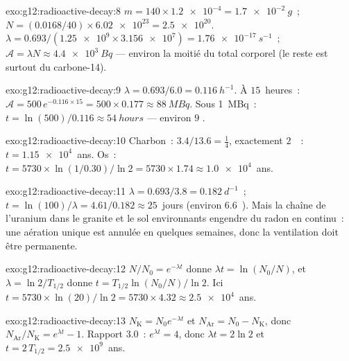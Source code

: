 \begin{solution}{exo:g12:radioactive-decay:8}
$m = 140 \times \num{1.2e-4} = \qty{1.7e-2}{g}$~;
$N = (0.0168/40) \times \num{6.02e23} = \num{2.5e20}$.
$\lambda = 0.693/(\num{1.25e9} \times \num{3.156e7}) =
\qty{1.76e-17}{s^{-1}}$~; $\mathcal A = \lambda N \approx
\qty{4.4e3}{Bq}$ --- environ la moitié du total corporel (le reste
est surtout du carbone-14).
\end{solution}

\begin{solution}{exo:g12:radioactive-decay:9}
$\lambda = 0.693/6.0 = \qty{0.116}{h^{-1}}$. À $15$~heures~:
$\mathcal A = 500\,e^{-0.116 \times 15} = 500 \times 0.177 \approx
\qty{88}{MBq}$. Sous \qty{1}{MBq}~:
$t = \ln(500)/0.116 \approx \qty{54}{hours}$ --- environ $9$
.
\end{solution}

\begin{solution}{exo:g12:radioactive-decay:10}
Charbon~: $3.4/13.6 = \tfrac14$, exactement $2$~~:
$t = \num{1.15e4}$~ans. Os~:
$t = \num{5730} \times \ln(1/0.30)/\ln 2 = \num{5730} \times 1.74
\approx \num{1.0e4}$~ans.
\end{solution}

\begin{solution}{exo:g12:radioactive-decay:11}
$\lambda = 0.693/3.8 = \qty{0.182}{d^{-1}}$~;
$t = \ln(100)/\lambda = 4.61/0.182 \approx 25$~jours (environ
$6.6$~). Mais la chaîne de l'uranium dans le granite et le
sol environnants engendre du radon en continu~: une aération unique
est annulée en quelques semaines, donc la ventilation doit être
permanente.
\end{solution}

\begin{solution}{exo:g12:radioactive-decay:12}
$N/N_0 = e^{-\lambda t}$ donne $\lambda t = \ln(N_0/N)$, et
$\lambda = \ln 2/T_{1/2}$ donne $t = T_{1/2}\ln(N_0/N)/\ln 2$. Ici
$t = \num{5730} \times \ln(20)/\ln 2 = \num{5730} \times 4.32
\approx \num{2.5e4}$~ans.
\end{solution}

\begin{solution}{exo:g12:radioactive-decay:13}
$N_{\mathrm K} = N_0 e^{-\lambda t}$ et
$N_{\mathrm{Ar}} = N_0 - N_{\mathrm K}$, donc
$N_{\mathrm{Ar}}/N_{\mathrm K} = e^{\lambda t} - 1$. Rapport $3.0$~:
$e^{\lambda t} = 4$, donc $\lambda t = 2\ln 2$ et
$t = 2\,T_{1/2} = \num{2.5e9}$~ans.
\end{solution}

